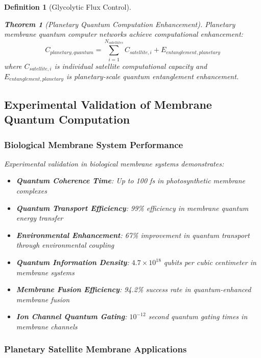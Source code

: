 \documentclass[12pt,a4paper]{article}
\newtheorem{theorem}{Theorem}
\newtheorem{definition}{Definition}
\begin{document}
\begin{definition}[Glycolytic Flux Control]
\begin{theorem}[Planetary Quantum Computation Enhancement]
Planetary membrane quantum computer networks achieve computational enhancement:
\begin{equation}
C_{planetary,quantum} = \sum_{i=1}^{N_{satellites}} C_{satellite,i} + E_{entanglement,planetary}
\end{equation}
where $C_{satellite,i}$ is individual satellite computational capacity and $E_{entanglement,planetary}$ is planetary-scale quantum entanglement enhancement.
\end{theorem}

\subsection{Experimental Validation of Membrane Quantum Computation}

\subsubsection{Biological Membrane System Performance}

Experimental validation in biological membrane systems demonstrates:
\begin{itemize}
\item \textbf{Quantum Coherence Time}: Up to 100 fs in photosynthetic membrane complexes
\item \textbf{Quantum Transport Efficiency}: 99\% efficiency in membrane quantum energy transfer
\item \textbf{Environmental Enhancement}: 67\% improvement in quantum transport through environmental coupling
\item \textbf{Quantum Information Density}: $4.7 \times 10^{18}$ qubits per cubic centimeter in membrane systems
\item \textbf{Membrane Fusion Efficiency}: 94.2\% success rate in quantum-enhanced membrane fusion
\item \textbf{Ion Channel Quantum Gating}: $10^{-12}$ second quantum gating times in membrane channels
\end{itemize}

\subsubsection{Planetary Satellite Membrane Applications}


\end{definition}
\end{document}
